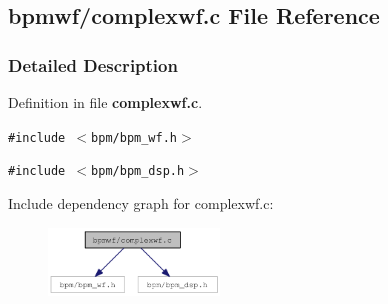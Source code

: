 \subsection{bpmwf/complexwf.c File Reference}
\label{complexwf_8c}


\subsubsection{Detailed Description}


Definition in file {\bf complexwf.c}.

{\tt \#include $<$bpm/bpm\_\-wf.h$>$}\par
{\tt \#include $<$bpm/bpm\_\-dsp.h$>$}\par


Include dependency graph for complexwf.c:\nopagebreak
\begin{figure}[H]
\begin{center}
\leavevmode
\includegraphics[width=129pt]{complexwf_8c__incl}
\end{center}
\end{figure}
